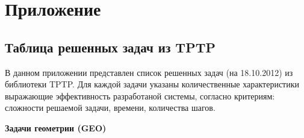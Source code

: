 \chapter*{Приложение}






\section*{Таблица решенных задач из TPTP}
В данном приложении представлен список решенных задач (на 18.10.2012) из библиотеки TPTP. Для каждой задачи указаны количественные характеристики выражающие эффективность разработаной системы, согласно критериям: сложности решаемой задачи, времени, количества шагов.

\textbf{Задачи геометрии (GEO)}
 
